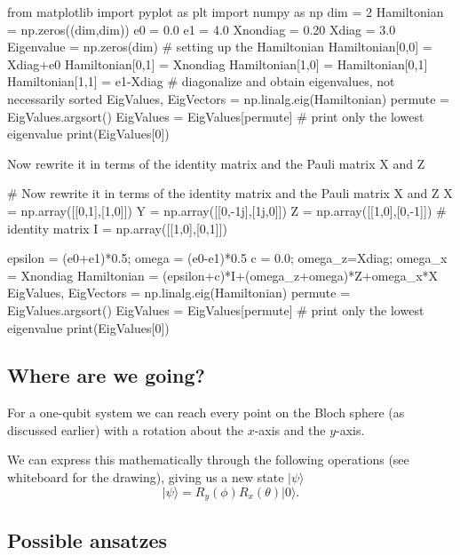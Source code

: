 \documentclass[%
oneside,                 %
final,                   %
10pt]{article}
\begin{document}
\bpycod
from  matplotlib import pyplot as plt
import numpy as np
dim = 2
Hamiltonian = np.zeros((dim,dim))
e0 = 0.0
e1 = 4.0
Xnondiag = 0.20
Xdiag = 3.0
Eigenvalue = np.zeros(dim)
# setting up the Hamiltonian
Hamiltonian[0,0] = Xdiag+e0
Hamiltonian[0,1] = Xnondiag
Hamiltonian[1,0] = Hamiltonian[0,1]
Hamiltonian[1,1] = e1-Xdiag
# diagonalize and obtain eigenvalues, not necessarily sorted
EigValues, EigVectors = np.linalg.eig(Hamiltonian)
permute = EigValues.argsort()
EigValues = EigValues[permute]
# print only the lowest eigenvalue
print(EigValues[0])

\epycod


Now rewrite it in terms of the identity matrix and the Pauli matrix X and Z

















\bpycod
# Now rewrite it in terms of the identity matrix and the Pauli matrix X and Z
X = np.array([[0,1],[1,0]])
Y = np.array([[0,-1j],[1j,0]])
Z = np.array([[1,0],[0,-1]])
# identity matrix
I = np.array([[1,0],[0,1]])

epsilon = (e0+e1)*0.5; omega = (e0-e1)*0.5
c = 0.0; omega_z=Xdiag; omega_x = Xnondiag
Hamiltonian = (epsilon+c)*I+(omega_z+omega)*Z+omega_x*X
EigValues, EigVectors = np.linalg.eig(Hamiltonian)
permute = EigValues.argsort()
EigValues = EigValues[permute]
# print only the lowest eigenvalue
print(EigValues[0])

\epycod


\subsection{Where are we going?}

For a one-qubit system we can reach every point on the Bloch sphere
(as discussed earlier) with a rotation about the $x$-axis and the
$y$-axis.

We can express this mathematically through the following operations (see whiteboard for the drawing), giving us a new state $\vert \psi\rangle$
\[
\vert\psi\rangle = R_y(\phi)R_x(\theta)\vert 0 \rangle.
\]

\subsection{Possible ansatzes}
\end{document}
